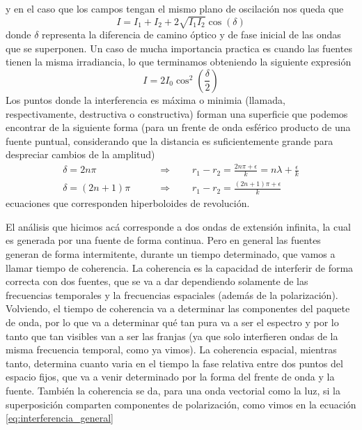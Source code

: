 \documentclass[a4paper]{article}
\numberwithin{equation}{section}
\begin{document}
	y en el caso que los campos tengan el mismo plano de oscilación nos queda que
	\begin{equation}
		I = I_1 + I_2 + 2 \sqrt{I_1 I_2} \cos(\delta)
		\label{eq:interferencia_particular}
	\end{equation}
	donde $\delta$ representa la diferencia de camino óptico y de fase inicial de las ondas que se superponen. Un caso de mucha importancia practica es cuando las fuentes tienen la misma irradiancia, lo que terminamos obteniendo la siguiente expresión
	\begin{equation}
		I = 2 I_0 \cos^2\left(\frac{\delta}{2}\right)
		\label{eq:interferencia_patron_clasico}
	\end{equation}
	Los puntos donde la interferencia es máxima o minimia (llamada, respectivamente, destructiva o constructiva) forman una superficie que podemos encontrar de la siguiente forma (para un frente de onda esférico producto de una fuente puntual, considerando que la distancia es suficientemente grande para despreciar cambios de la amplitud)
	\begin{align}
		\delta = 2n\pi \qquad &\Rightarrow \qquad r_1 - r_2 = \frac{2n\pi + \epsilon}{k} = n\lambda + \frac{\epsilon}{k}\\
		\delta = (2n + 1)\pi \qquad &\Rightarrow \qquad r_1 - r_2 = \frac{(2n + 1)\pi + \epsilon}{k}
	\end{align}
	ecuaciones que corresponden hiperboloides de revolución.
	
	El análisis que hicimos acá corresponde a dos ondas de extensión infinita, la cual es generada por una fuente de forma continua. Pero en general las fuentes generan de forma intermitente, durante un tiempo determinado, que vamos a llamar tiempo de coherencia. La coherencia es la capacidad de interferir de forma correcta con dos fuentes, que se va a dar dependiendo solamente de las frecuencias temporales y la frecuencias espaciales (además de la polarización). Volviendo, el tiempo de coherencia va a determinar las componentes del paquete de onda, por lo que va a determinar qué tan pura va a ser el espectro y por lo tanto que tan visibles van a ser las franjas (ya que solo interfieren ondas de la misma frecuencia temporal, como ya vimos). La coherencia espacial, mientras tanto, determina cuanto varia en el tiempo la fase relativa entre dos puntos del espacio fijos, que va a venir determinado por la forma del frente de onda y la fuente. También la coherencia se da, para una onda vectorial como la luz, si la superposición comparten componentes de polarización, como vimos en la ecuación \ref{eq:interferencia_general}
	
\end{document}
